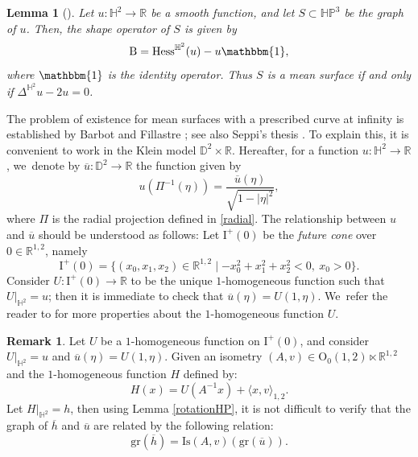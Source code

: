 \documentclass[10pt]{amsart}
\theoremstyle{plain}
\newtheorem{lemma}[cor]{Lemma}
\theoremstyle{definition}
\newtheorem{remark}[cor]{Remark}
\newcommand{\minko}{\mathbb{R}^{1,2}}
\newcommand{\HP}{\mathbb{HP}^3}
\newcommand{\I}{\mathrm{I}}
\newcommand{\hess}{\mathrm{Hess}^{\mathbb{H}^2}}
\newcommand{\B}{\mathrm{B}}
\newcommand{\inner}[1] {\langle #1 \rangle}
\begin{document}
\begin{lemma}[{\cite[Lem.\,9.1.7]{Seppi_thesis}}]\label{Shapeoperator_of_graph}
Let $u:\mathbb{H}^2\to\mathbb{R}$ be a smooth function, and let $S\subset\HP$ be the graph of $u$. Then, the shape operator of $S$ is given by
\[
\B=\hess(u)-u\mathbbm{1},
\]
where $\mathbbm{1}$ is the identity operator. Thus $S$ is a mean surface if and only if $\Delta^{\mathbb{H}^2} u-2u=0$.
\end{lemma}
The problem of existence for mean surfaces with a prescribed curve at infinity is established by Barbot and Fillastre \cite{barbotfillastre}; see also Seppi's thesis \cite[Chap.\,9]{Seppi_thesis}. To explain this, it is convenient to work in the Klein model $\mathbb{D}^2\times\mathbb{R}$. Hereafter, for a function $u:\mathbb{H}^2\to\mathbb{R}$, we~denote by $\overline{u}:\mathbb{D}^2\to\mathbb{R}$ the function given by
\begin{equation}\label{u_et_u_bar}
u(\Pi^{-1}(\eta))=\frac{\overline{u}(\eta)}{\sqrt{1-\lvert\eta\rvert^2}},
\end{equation} where $\Pi$ is the radial projection defined in \eqref{radial}. The relationship between $u$ and $\overline{u}$ should be understood as follows: Let $\I^+(0)$ be the \emph{future cone} over $0\in\minko$, namely
\[
\I^+(0)=\{(x_0,x_1,x_2)\in\minko\mid -x_0^2+x_1^2+x_2^2<0,\ x_0>0 \}.
\]
Consider $U:\I^{+}(0)\to\mathbb{R}$ to be the unique $1$-homogeneous function such that $U|_{\mathbb{H}^2}=u$; then it is immediate to check that $\overline{u}(\eta)=U(1,\eta)$. We~refer the reader to \cite{françois_vernolli} for more properties about the $1$-homogeneous function $U$.

\begin{remark}
Let $U$ be a $1$-homogeneous function on $\I^{+}(0)$, and consider $U|_{\mathbb{H}^2}=u$ and $\overline{u}(\eta)=U(1,\eta)$. Given an isometry $(A,v)\in\mathrm{O}_0(1,2)\ltimes\minko$ and the $1$-homogeneous function $H$ defined by:
\[
H(x)=U(A^{-1}x)+\inner{x,v}_{1,2}.
\]Let $H|_{\mathbb{H}^2}=h$, then using Lemma \ref{rotationHP}, it is not difficult to verify that the graph of $\overline{h}$ and $\overline{u}$ are related by the following relation:
\begin{equation}\label{h_et_h_bar}
\mathrm{gr}(\overline{h})=\mathrm{Is}(A,v)(\mathrm{gr}(\overline{u})).
\end{equation}
\end{remark}
\end{document}
